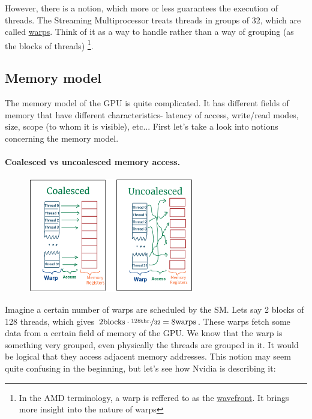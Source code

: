 \documentclass[12pt]{article}
\begin{document}
However, there is a notion, which more or less guarantees the execution of threads. The Streaming Multiprocessor
treats threads in groups of 32, which are called \underline{warps}. Think of it as a way to handle rather than 
a way of grouping (as the blocks of threads) \footnote{In the AMD terminology, a warp is reffered to as the 
\underline{wavefront}. It brings more insight into the nature of warps}.

\subsection{Memory model}
The memory model of the GPU is quite complicated. It has different fields of memory that have different characteristics-
latency of access, write/read modes, size, scope (to whom it is visible), etc... First let's take a look into 
notions concerning the memory model.
\vspace{-15pt}
\paragraph{Coalesced vs uncoalesced memory access.} 

\begin{figure}
      \vspace{-10pt}
      \centering
      \includegraphics[height=5cm]{coalesced.png}
   \caption{}
   \label{coalesced}
\end{figure}

Imagine a certain number of warps are scheduled by the SM. Lets say 2 blocks of 128 threads, which gives 
$2\text{blocks}\cdot\nicefrac{128\text{thr.}}{32} = 8 \text{warps}$. These warps fetch some data 
from a certain field of memory of the GPU. We know that the warp is something very grouped, even physically 
the threads are grouped in it. It would be logical that they access adjacent memory addresses. This notion 
may seem quite confusing in the beginning, but let's see how Nvidia is describing it:
\end{document}
